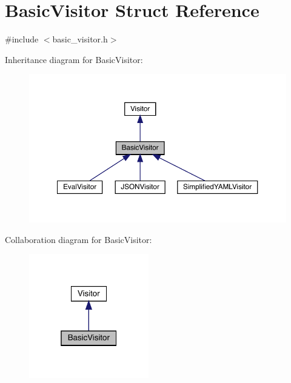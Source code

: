 \hypertarget{struct_basic_visitor}{}\section{Basic\+Visitor Struct Reference}
\label{struct_basic_visitor}


{\ttfamily \#include $<$basic\+\_\+visitor.\+h$>$}



Inheritance diagram for Basic\+Visitor\+:
\nopagebreak
\begin{figure}[H]
\begin{center}
\leavevmode
\includegraphics[width=350pt]{struct_basic_visitor__inherit__graph}
\end{center}
\end{figure}


Collaboration diagram for Basic\+Visitor\+:\nopagebreak
\begin{figure}[H]
\begin{center}
\leavevmode
\includegraphics[width=148pt]{struct_basic_visitor__coll__graph}
\end{center}
\end{figure}

